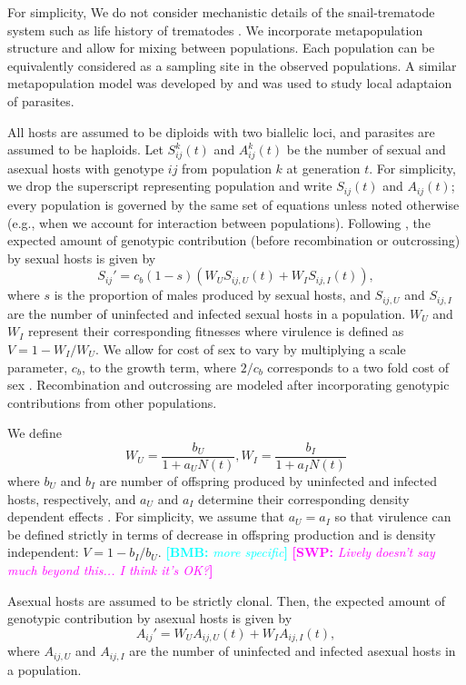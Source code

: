 \documentclass{article}\usepackage[]{graphicx}\usepackage[]{color}
\newcommand{\comment}[3]{\textcolor{#1}{\textbf{[#2: }\textit{#3}\textbf{]}}}
\newcommand{\bmb}[1]{\comment{cyan}{BMB}{#1}}
\newcommand{\swp}[1]{\comment{magenta}{SWP}{#1}}
\begin{document}
For simplicity, We do not consider mechanistic details of the snail-trematode system such as life history of trematodes \citep{vergara2014infection}.
We incorporate metapopulation structure and allow for mixing between populations.
Each population can be equivalently considered as a sampling site in the observed populations.
A similar metapopulation model was developed by \cite{lively2017habitat} and was used to study local adaptaion of parasites.

All hosts are assumed to be diploids with two biallelic loci, and parasites are assumed to be haploids.
Let $S_{ij}^k(t)$ and $A_{ij}^k(t)$ be the number of sexual and asexual hosts with genotype $ij$ from population $k$ at generation $t$. 
For simplicity, we drop the superscript representing population and write $S_{ij}(t)$ and $A_{ij}(t)$;
every population is governed by the same set of equations unless noted otherwise (e.g., when we account for interaction between populations).
Following \cite{lively2010epidemiological}, the expected amount of genotypic contribution (before recombination or outcrossing) by sexual hosts is given by
\begin{equation}
S_{ij}' = c_b (1-s) \left(W_U S_{ij,U} (t) + W_I S_{ij,I} (t)\right),
\end{equation}
where $s$ is the proportion of males produced by sexual hosts, and $S_{ij, U}$ and $S_{ij,I}$ are the number of uninfected and infected sexual hosts in a population.
$W_U$ and $W_I$ represent their corresponding fitnesses where virulence is defined as $V = 1-W_I/W_U$.
We allow for cost of sex to vary by multiplying a scale parameter, $c_b$, to the growth term, where $2/c_b$ corresponds to a two fold cost of sex \citep{ashby2015diversity}.
Recombination and outcrossing are modeled after incorporating genotypic contributions from other populations.

We define
$$
W_U = \frac{b_U}{1 + a_U N(t)}, W_I = \frac{b_I}{1 + a_I N(t)}
$$
where $b_U$ and $b_I$ are number of offspring produced by uninfected and infected hosts, respectively, and $a_U$ and $a_I$ determine their corresponding density dependent effects \citep{lively2010epidemiological, smith1973stability}.
For simplicity, we assume that $a_U = a_I$ so that virulence can be defined strictly in terms of decrease in offspring production and is density independent: $V = 1- b_I/b_U$.
\bmb{more specific}
\swp{Lively doesn't say much beyond this... I think it's OK?}

Asexual hosts are assumed to be strictly clonal.
Then, the expected amount of genotypic contribution by asexual hosts is given by
\begin{equation}
A_{ij}' = W_U A_{ij,U} (t) + W_I A_{ij,I} (t),
\end{equation}
where $A_{ij, U}$ and $A_{ij,I}$ are the number of uninfected and infected asexual hosts in a population.
\end{document}
